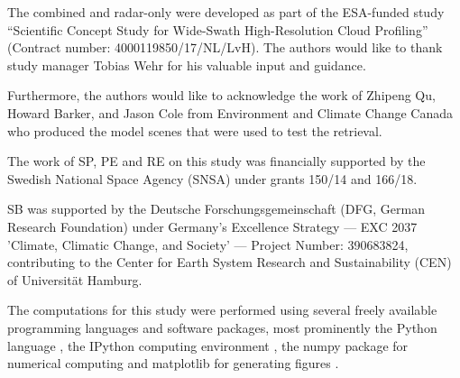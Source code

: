 \documentclass[journal abbreviation, manuscript]{copernicus}
\begin{document}
\begin{acknowledgements}

The combined and radar-only were developed as part of the ESA-funded study
``Scientific Concept Study for Wide-Swath High-Resolution Cloud Profiling''
(Contract number: 4000119850/17/NL/LvH). The authors would like to thank
study manager Tobias Wehr for his valuable input and guidance.

Furthermore, the authors would like to acknowledge the work of Zhipeng Qu,
Howard Barker, and Jason Cole from Environment and Climate Change Canada who
produced the model scenes that were used to test the retrieval.

The work of SP, PE and RE on this study was financially supported by the Swedish National Space Agency
(SNSA) under grants 150/14 and 166/18.

SB was supported by the Deutsche Forschungsgemeinschaft (DFG, German Research
Foundation) under Germany's Excellence Strategy --- EXC 2037 'Climate, Climatic
Change, and Society' --- Project Number: 390683824, contributing to the Center
for Earth System Research and Sustainability (CEN) of Universit\"{a}t Hamburg.

The computations for this study were performed using several freely available programming
languages and software packages, most prominently the Python language
\citep{python}, the IPython computing environment \citep{ipython}, the numpy
package for numerical computing \citep{numpy} and matplotlib for generating
figures \citep{matplotlib}.

\end{acknowledgements}












\end{document}
